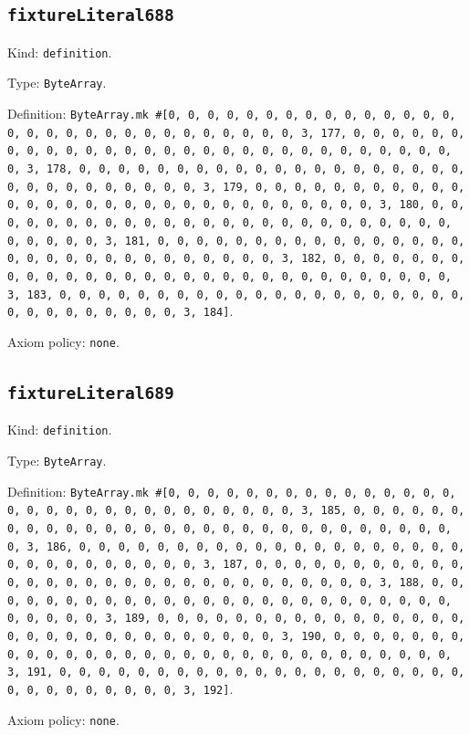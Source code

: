 \documentclass[11pt]{article}
\begin{document}
\subsection*{\texttt{fixtureLiteral688}}
\noindent Kind: \texttt{definition}.\par
\noindent Type: \texttt{ByteArray}.\par
\noindent Definition: \texttt{ByteArray.mk \#[0, 0, 0, 0, 0, 0, 0, 0, 0, 0, 0, 0, 0, 0, 0, 0, 0, 0, 0, 0, 0, 0, 0, 0, 0, 0, 0, 0, 0, 0, 3, 177, 0, 0, 0, 0, 0, 0, 0, 0, 0, 0, 0, 0, 0, 0, 0, 0, 0, 0, 0, 0, 0, 0, 0, 0, 0, 0, 0, 0, 0, 0, 3, 178, 0, 0, 0, 0, 0, 0, 0, 0, 0, 0, 0, 0, 0, 0, 0, 0, 0, 0, 0, 0, 0, 0, 0, 0, 0, 0, 0, 0, 0, 0, 3, 179, 0, 0, 0, 0, 0, 0, 0, 0, 0, 0, 0, 0, 0, 0, 0, 0, 0, 0, 0, 0, 0, 0, 0, 0, 0, 0, 0, 0, 0, 0, 3, 180, 0, 0, 0, 0, 0, 0, 0, 0, 0, 0, 0, 0, 0, 0, 0, 0, 0, 0, 0, 0, 0, 0, 0, 0, 0, 0, 0, 0, 0, 0, 3, 181, 0, 0, 0, 0, 0, 0, 0, 0, 0, 0, 0, 0, 0, 0, 0, 0, 0, 0, 0, 0, 0, 0, 0, 0, 0, 0, 0, 0, 0, 0, 3, 182, 0, 0, 0, 0, 0, 0, 0, 0, 0, 0, 0, 0, 0, 0, 0, 0, 0, 0, 0, 0, 0, 0, 0, 0, 0, 0, 0, 0, 0, 0, 3, 183, 0, 0, 0, 0, 0, 0, 0, 0, 0, 0, 0, 0, 0, 0, 0, 0, 0, 0, 0, 0, 0, 0, 0, 0, 0, 0, 0, 0, 0, 0, 3, 184]}.\par
\noindent Axiom policy: \texttt{none}.\par
\subsection*{\texttt{fixtureLiteral689}}
\noindent Kind: \texttt{definition}.\par
\noindent Type: \texttt{ByteArray}.\par
\noindent Definition: \texttt{ByteArray.mk \#[0, 0, 0, 0, 0, 0, 0, 0, 0, 0, 0, 0, 0, 0, 0, 0, 0, 0, 0, 0, 0, 0, 0, 0, 0, 0, 0, 0, 0, 0, 3, 185, 0, 0, 0, 0, 0, 0, 0, 0, 0, 0, 0, 0, 0, 0, 0, 0, 0, 0, 0, 0, 0, 0, 0, 0, 0, 0, 0, 0, 0, 0, 3, 186, 0, 0, 0, 0, 0, 0, 0, 0, 0, 0, 0, 0, 0, 0, 0, 0, 0, 0, 0, 0, 0, 0, 0, 0, 0, 0, 0, 0, 0, 0, 3, 187, 0, 0, 0, 0, 0, 0, 0, 0, 0, 0, 0, 0, 0, 0, 0, 0, 0, 0, 0, 0, 0, 0, 0, 0, 0, 0, 0, 0, 0, 0, 3, 188, 0, 0, 0, 0, 0, 0, 0, 0, 0, 0, 0, 0, 0, 0, 0, 0, 0, 0, 0, 0, 0, 0, 0, 0, 0, 0, 0, 0, 0, 0, 3, 189, 0, 0, 0, 0, 0, 0, 0, 0, 0, 0, 0, 0, 0, 0, 0, 0, 0, 0, 0, 0, 0, 0, 0, 0, 0, 0, 0, 0, 0, 0, 3, 190, 0, 0, 0, 0, 0, 0, 0, 0, 0, 0, 0, 0, 0, 0, 0, 0, 0, 0, 0, 0, 0, 0, 0, 0, 0, 0, 0, 0, 0, 0, 3, 191, 0, 0, 0, 0, 0, 0, 0, 0, 0, 0, 0, 0, 0, 0, 0, 0, 0, 0, 0, 0, 0, 0, 0, 0, 0, 0, 0, 0, 0, 0, 3, 192]}.\par
\noindent Axiom policy: \texttt{none}.\par
\end{document}
